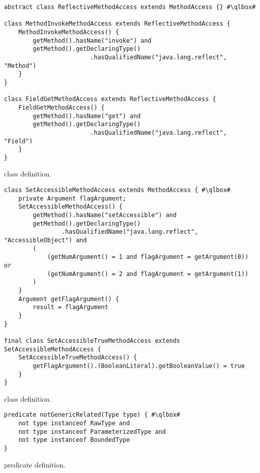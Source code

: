 \begin{listing}
\begin{verbatim}	
abstract class ReflectiveMethodAccess extends MethodAccess {} #\qlbox#

class MethodInvokeMethodAccess extends ReflectiveMethodAccess {
	MethodInvokeMethodAccess() {
		getMethod().hasName("invoke") and
		getMethod().getDeclaringType()
						.hasQualifiedName("java.lang.reflect", "Method")
	}
}

class FieldGetMethodAccess extends ReflectiveMethodAccess {
	FieldGetMethodAccess() {
		getMethod().hasName("get") and
		getMethod().getDeclaringType()
						.hasQualifiedName("java.lang.reflect", "Field")
	}
}
\end{verbatim}
\caption{ class definition.}
\label{lst:ql:ReflectiveMethodAccess}
\end{listing}

\begin{listing}
\begin{verbatim}
class SetAccessibleMethodAccess extends MethodAccess { #\qlbox#
	private Argument flagArgument;
	SetAccessibleMethodAccess() {
		getMethod().hasName("setAccessible") and
		getMethod().getDeclaringType()
				.hasQualifiedName("java.lang.reflect", "AccessibleObject") and
		(
			(getNumArgument() = 1 and flagArgument = getArgument(0)) or
			(getNumArgument() = 2 and flagArgument = getArgument(1))
		)
	}	
	Argument getFlagArgument() {
		result = flagArgument
	}
}

final class SetAccessibleTrueMethodAccess extends SetAccessibleMethodAccess {
	SetAccessibleTrueMethodAccess() {
		getFlagArgument().(BooleanLiteral).getBooleanValue() = true
	}
}
\end{verbatim}
\caption{ class definition.}
\label{lst:ql:SetAccessibleTrueMethodAccess}
\end{listing}


\begin{listing}
\begin{verbatim}
predicate notGenericRelated(Type type) { #\qlbox#
	not type instanceof RawType and
	not type instanceof ParameterizedType and
	not type instanceof BoundedType
}
\end{verbatim}
\caption{ predicate definition.}
\label{lst:ql:notGenericRelated}
\end{listing}
